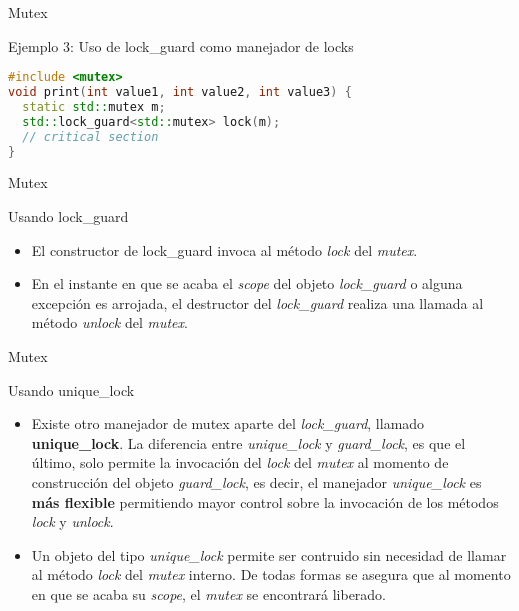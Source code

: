 \begin{frame}[fragile]{Mutex}
\begin{block}{Ejemplo 3: Uso de lock\_guard como manejador de locks}
\begin{lstlisting}[language=C++, basicstyle=\small]
#include <mutex>
void print(int value1, int value2, int value3) {
  static std::mutex m;
  std::lock_guard<std::mutex> lock(m);
  // critical section
}
\end{lstlisting}
\end{block}
\end{frame}

\begin{frame}{Mutex}
\begin{block}{Usando lock\_guard}
\begin{itemize}
  \item El constructor de lock\_guard invoca al método \textit{lock} del \textit{mutex}.
  \item En el instante en que se acaba el \textit{scope} del objeto \textit{lock\_guard} o alguna excepción es arrojada, el destructor del \textit{lock\_guard} realiza una llamada al método \textit{unlock} del \textit{mutex}.
\end{itemize}
\end{block}
\end{frame}

\begin{frame}{Mutex}
\begin{block}{Usando unique\_lock}
\begin{itemize}
  \item Existe otro manejador de mutex aparte del \textit{lock\_guard}, llamado \textbf{unique\_lock}. La diferencia entre \textit{unique\_lock} y \textit{guard\_lock}, es que el último, solo permite la invocación del \textit{lock} del \textit{mutex} al momento de construcción del objeto \textit{guard\_lock}, es decir, el manejador \textit{unique\_lock} es \textbf{más flexible} permitiendo mayor control sobre la invocación de los métodos \textit{lock} y \textit{unlock}.
  \item Un objeto del tipo \textit{unique\_lock} permite ser contruido sin necesidad de llamar al método \textit{lock} del \textit{mutex} interno. De todas formas se asegura que al momento en que se acaba su \textit{scope}, el \textit{mutex} se encontrará liberado.
\end{itemize}
\end{block}
\end{frame}

